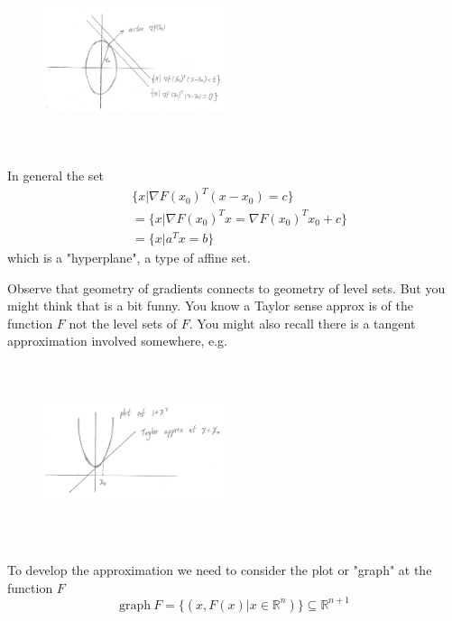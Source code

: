\begin{figure}
	\centering
	\includegraphics[width=2.1in,height=2.1in]{figures/ch02/p61.jpg}
\end{figure}

In general the set
\begin{align*}
&\{x | \nabla F(x_0)^{T} (x-x_0) = c\}\\
&= \{x | \nabla F(x_0)^{T} x = \nabla F(x_0)^{T} x_0 + c\} \\
&= \{x | a^{T}x = b\}
\end{align*}
which is a "hyperplane", a type of affine set. 

\vspace{0.5cm}
Observe that geometry of gradients connects to geometry of level sets. But you might think that is a bit funny. You know a Taylor sense approx is of the function $F$ not the level sets of $F$. You might also recall there is a tangent approximation involved somewhere, e.g. 

\begin{figure}
	\centering
	\includegraphics[width=2.1in,height=2.1in]{figures/ch02/p62.jpg}
\end{figure}


To develop the approximation we need to consider the plot or "graph" at the function $F$
$$\text{graph}\ F = \{(x, F(x) | x \in \mathbb{R}^n)\} \subseteq \mathbb{R}^{n+1}$$

